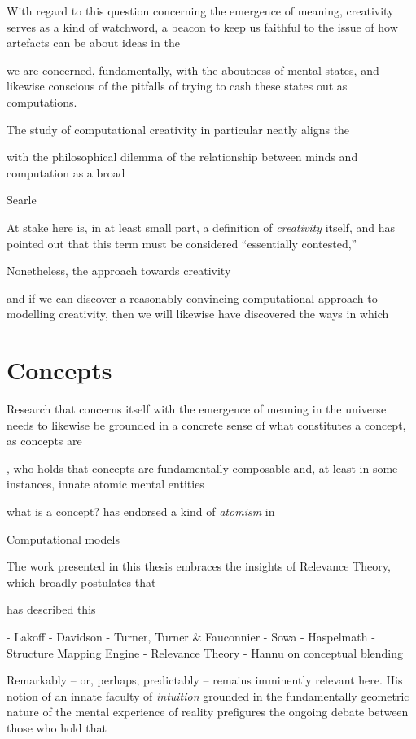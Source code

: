With regard to this question concerning the emergence of meaning, creativity serves as a kind of watchword, a beacon to keep us faithful to the issue of how artefacts can be about ideas in the 

we are concerned, fundamentally, with the aboutness of mental states, and likewise conscious of the pitfalls of trying to cash these states out as computations.

The study of computational creativity in particular neatly aligns the 

with the philosophical dilemma of the relationship between minds and computation as a broad

Searle

At stake here is, in at least small part, a definition of \emph{creativity} itself, and \cite{Colton} has pointed out that this term must be considered ``essentially contested,''

Nonetheless, the approach towards creativity 

and if we can discover a reasonably convincing computational approach to modelling creativity, then we will likewise have discovered the ways in which 

\section{Concepts}
Research that concerns itself with the emergence of meaning in the universe needs to likewise be grounded in a concrete sense of what constitutes a concept, as concepts are

\cite{Fodor}, who holds that concepts are fundamentally composable and, at least in some instances, innate atomic mental entities

what is a concept?  \cite{Fodor} has endorsed a kind of \emph{atomism} in 

\citep[cf][for a case against conceptual schema in general]{Davidson}

Computational models 

The work presented in this thesis embraces the insights of Relevance Theory, which broadly postulates that 

\cite{Carston} has described this 

- Lakoff
- Davidson
- Turner, Turner \& Fauconnier
- Sowa
- Haspelmath
- Structure Mapping Engine
- Relevance Theory
- Hannu on conceptual blending

Remarkably -- or, perhaps, predictably -- \cite{Kant} remains imminently relevant here.  His notion of an innate faculty of \emph{intuition} grounded in the fundamentally geometric nature of the mental experience of reality prefigures the ongoing debate between those who hold that 

